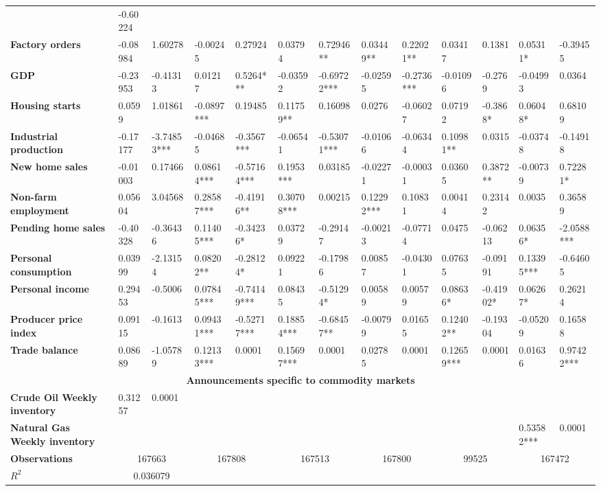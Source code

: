 \begin{sidewaystable}
{\begin{tabular}{@{}lllllllllllll@{}}
& -0.60224 \\ \textbf{Factory orders}& -0.08984 & 1.60278 & -0.00245 & 0.27924 & 0.03794 & 0.72946** & 0.03449** & 0.22021** & 0.03417 & 0.1381 & 0.05311* & -0.39455 \\ \textbf{GDP}& -0.23953 & -0.41313 & 0.01217 & 0.5264*** & -0.03592 & -0.69722*** & -0.02595 & -0.2736*** & -0.01096 & -0.2769 & -0.04993 & 0.0364 \\ \textbf{Housing starts}& 0.0599 & 1.01861 & -0.0897*** & 0.19485 & 0.11759** & 0.16098 & 0.0276 & -0.06027 & 0.07192 & -0.3868* & 0.06048* & 0.68109 \\ \textbf{Industrial production}& -0.17177 & -3.74853*** & -0.04685 & -0.3567***& -0.06541 & -0.53071*** & -0.01066 & -0.06344 & 0.10981** & 0.0315 & -0.03748 & -0.14918 \\ \textbf{New home sales}& -0.01003 & 0.17466 & 0.08614*** & -0.57164*** & 0.1953*** & 0.03185 & -0.02271 & -0.00031 & 0.03605 & 0.3872** & -0.00739 & 0.72281* \\ \textbf{Non-farm employment}& 0.05604 & 3.04568 & 0.28587*** & -0.41916** & 0.30708*** & 0.00215 & 0.12292*** & 0.10831 & 0.00414 & 0.23142 & 0.0035 & 0.36589 \\ \textbf{Pending home sales}& -0.40328 & -0.36436 & 0.11405*** & -0.34236* & 0.03729 & -0.29147 & -0.00213 & -0.07714 & 0.0475 & -0.06213 & 0.06356* & -2.0588*** \\ \textbf{Personal consumption}& 0.03999 & -2.13154 & 0.08202** & -0.28124* & 0.09221 & -0.17986 & 0.00857 & -0.04301 & 0.07635 & -0.09191 & 0.13395*** & -0.64605 \\ \textbf{Personal income}& 0.29453 & -0.5006 & 0.07845*** & -0.74149***& 0.08435 & -0.51294* & 0.00589 & 0.00579 & 0.08636* & -0.41902* & 0.06267* & 0.26214 \\ \textbf{Producer price index}& 0.09115 & -0.1613 & 0.09431***& -0.52717*** & 0.18854*** & -0.68457** & -0.00799 & 0.01655 & 0.12402** & -0.19304 & -0.05209 & 0.16588 \\ \textbf{Trade balance}& 0.08689 & -1.05789 & 0.12133*** & 0.0001& 0.15697*** & 0.0001& 0.02785 & 0.0001& 0.12659*** & 0.0001& 0.01636 & 0.97422*** \\  \midrule \multicolumn{13}{c}{\textbf{Announcements specific to commodity markets}} \\ \midrule \textbf{Crude Oil Weekly inventory}& 0.31257 & 0.0001&  &  &  &  &  &  &  &  &  &  \\ \textbf{Natural Gas Weekly inventory}&  &  &  &  &  &  &  &  &  &  & 0.53582*** & 0.0001\\  \midrule \textbf{Observations}             &\multicolumn{2}{c}{ 167663 }                                                 & \multicolumn{2}{c}{ 167808 }                                                 & \multicolumn{2}{c}{ 167513 }                                                 & \multicolumn{2}{c}{ 167800 }                                                 & \multicolumn{2}{c}{ 99525 }                                                   & \multicolumn{2}{c}{ 167472 }                                                 \\ \textbf{$R^2$}             &\multicolumn{2}{c}{ 0.036079 }      
\end{tabular}}
\end{sidewaystable}
